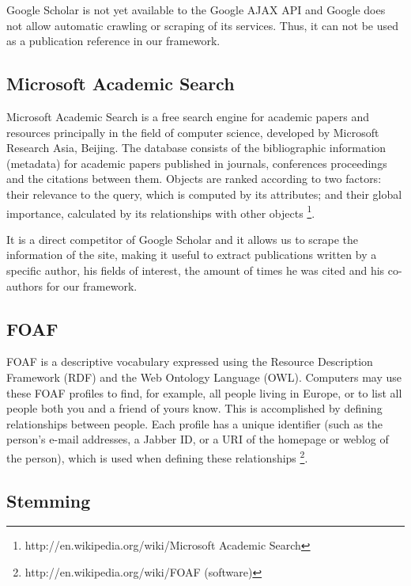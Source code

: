 Google Scholar is not yet available to the Google AJAX API and Google does not allow automatic crawling or scraping of its services. Thus, it can not be used as a publication reference in our framework.

\subsection{Microsoft Academic Search}

Microsoft Academic Search is a free search engine for academic papers and resources principally in the field of computer science, developed by Microsoft Research Asia, Beijing. The database consists of the bibliographic information (metadata) for academic papers published in journals, conferences proceedings and the citations between them. Objects are ranked according to two factors: their relevance to the query, which is computed by its attributes; and their global importance, calculated by its relationships with other objects \footnote{http://en.wikipedia.org/wiki/Microsoft Academic Search}.

It is a direct competitor of Google Scholar and it allows us to scrape the information of the site, making it useful to extract publications written by a specific author, his fields of interest, the amount of times he was cited and his co-authors for our framework.

\subsection{FOAF}

FOAF is a descriptive vocabulary expressed using the Resource Description Framework (RDF) and the Web Ontology Language (OWL). Computers may use these FOAF profiles to find, for example, all people living in Europe, or to list all people both you and a friend of yours know. This is accomplished by defining relationships between people. Each profile has a unique identifier (such as the person's e-mail addresses, a Jabber ID, or a URI of the homepage or weblog of the person), which is used when defining these relationships \footnote{http://en.wikipedia.org/wiki/FOAF (software)}.


\subsection{Stemming}

